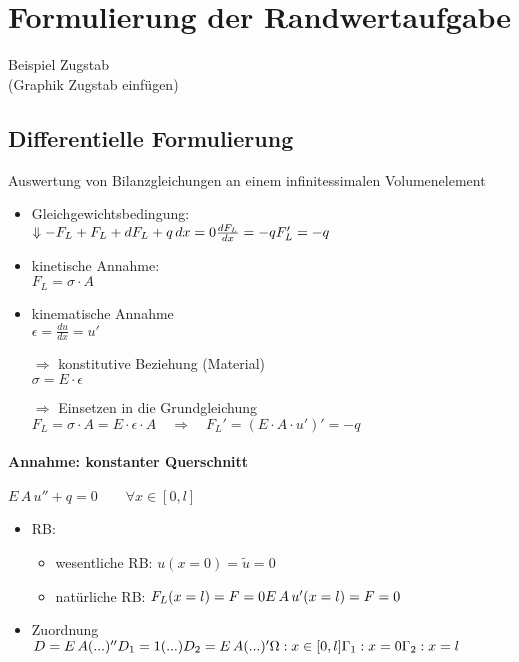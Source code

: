\section{Formulierung der Randwertaufgabe}
Beispiel Zugstab\\
(Graphik Zugstab einfügen)\\
\subsection{Differentielle Formulierung}
Auswertung von Bilanzgleichungen an einem infinitessimalen Volumenelement\\
\begin{itemize}
\item Gleichgewichtsbedingung: \\
\(\Downarrow -F_L + F_L + dF_L + q\,dx = 0 \\\\ \frac{dF_L}{dx} = -q \\\\ F_L' = -q\)

\item kinetische Annahme:\\
	\(F_L = \sigma \cdot A \)
	
\item kinematische Annahme\\
	\(\epsilon = \frac{du}{dx} = u'\)
	
\item[$\Rightarrow$] konstitutive Beziehung (Material)\\
	\(\sigma = E \cdot \epsilon\)
	
\item[$\Rightarrow$] Einsetzen in die Grundgleichung\\
	\(F_L = \sigma \cdot A = E \cdot \epsilon \cdot A \quad \Rightarrow \quad F_L' = (E \cdot A \cdot u')' = -q\)
\end{itemize}
\paragraph{Annahme: konstanter Querschnitt}
\(E\,A\,u'' + q = 0 \qquad \forall x \in [0,l]\)

\begin{itemize}
	\item RB: 
		\begin{itemize}
		\item wesentliche RB: \(u(x=0) = \tilde{u} = 0 \)
		\item natürliche RB: \(F_L (x=l) = F = 0 \\ E\,A\,u' (x=l) = F = 0\)
		\end{itemize}
	\item Zuordnung \\
			\(D = E\,A (...)'' \\
			D_1 = 1 (...) \\
			D_2 = E\,A(...)' \\
			\Omega : x \in [0, l] \\
			\Gamma_1 : x = 0 \\
			\Gamma_2 : x = l \)
\end{itemize}

